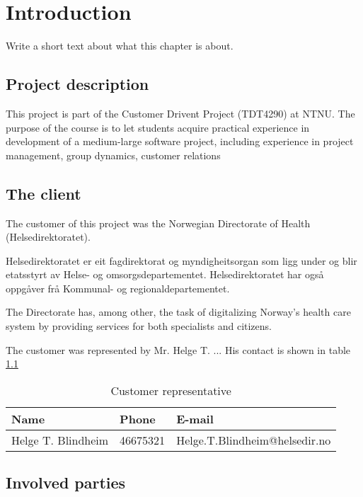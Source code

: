\chapter{Introduction} 
\label{Introduction} 

Write a short text about what this chapter is about.
\section{Project description}
This project is part of the Customer Drivent Project (TDT4290) at NTNU.
The purpose of the course is to let students acquire practical experience in development of a medium-large software project,
including experience in project management, group dynamics, customer relations
\section{The client}
The customer of this project was the Norwegian Directorate of Health (Helsedirektoratet).

Helsedirektoratet er eit fagdirektorat og myndigheitsorgan som ligg under og blir etatsstyrt av Helse- og omsorgsdepartementet. Helsedirektoratet har også oppgåver frå Kommunal- og regionaldepartementet.

The Directorate has, among other, the task of digitalizing Norway's health care system by providing services for both specialists and citizens.

The customer was represented by Mr. Helge T. ... His contact is shown in table \ref{table:client}

\begin{center}
\begin{table}
\begin{tabular}{ l | l | l }
  \hline
  Name & Phone & E-mail \\
  \hline\noalign{\smallskip}\noalign{\smallskip}\hline
  Helge T. Blindheim	& 46675321 & Helge.T.Blindheim@helsedir.no \\
  \hline
\end{tabular}
\caption{Customer representative}
\label{table:client}
\end{table}
\end{center}

\section{Involved parties}

